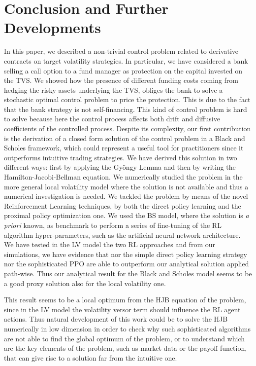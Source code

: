 \documentclass[11pt]{article}
\begin{document}
\section{Conclusion and Further Developments}
In this paper, we described a non-trivial control problem related to derivative contracts on target volatility strategies. In particular, we have considered a bank selling a call option to a fund manager as protection on the capital invested on the TVS. We showed how the presence of different funding costs coming from hedging the risky assets underlying the TVS, obliges the bank to solve a stochastic optimal control problem to price the protection. This is due to the fact that the bank strategy is not self-financing. This kind of control problem is hard to solve because here the control process affects both drift and diffusive coefficients of the controlled process. Despite its complexity, our first contribution is the derivation of a closed form solution of the control problem in a Black and Scholes framework, which could represent a useful tool for practitioners since it outperforms intuitive trading strategies. We have derived this solution in two different ways: first by applying the Gy\"ongy  Lemma and then by writing the Hamilton-Jacobi-Bellman equation.  We numerically studied the problem in the more general local volatility model where the solution is not available and thus a numerical investigation is needed. We tackled the problem by means of the novel Reinforcement Learning techniques, by both the direct policy learning and the proximal policy optimization one. We used the BS model, where the solution is \textit{a priori} known, as benchmark to perform a series of fine-tuning of the RL algorithm hyper-parameters, such as the artificial neural network architecture. We have tested in the LV model the two RL approaches and from our simulations, we have evidence that nor the simple direct policy learning strategy nor the sophisticated PPO are able to outperform our analytical solution applied path-wise. Thus our analytical result for the Black and Scholes model seems to be a good proxy solution also for the local volatility one.

 This result seems to be a local optimum from the HJB equation of the problem, since in the LV model the volatility versor term should influence the RL agent actions. Thus natural development of this work could be to solve the HJB numerically in low dimension in order to check why such sophisticated algorithms are not able to find the global optimum of the problem, or to understand which are the key elements of the problem, such as market data or the payoff function, that can give rise to a solution far from the intuitive one. 



\printbibliography
\end{document}
